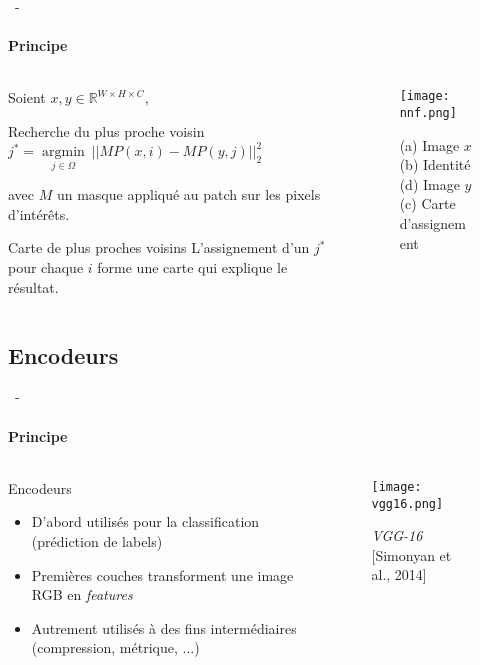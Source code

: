\documentclass[aspectratio=169, 22pt]{beamer}
\DeclareMathOperator*{\argmin}{argmin}
\begin{document}
\begin{frame}{\secname~- \subsecname} 
  \framesubtitle{Principe}
  \begin{columns}
    \begin{column}{0.6\linewidth}
      Soient $x, y \in \mathbb{R}^{W \times H \times C}$,
      \begin{block}{Recherche du plus proche voisin}
        \centering
        $j^* = \underset{j \in \Omega}{\argmin}\ ||MP(x,i) - MP(y,j)||_2^2$
      \end{block}
      {\small avec $M$ un masque appliqué au patch sur les pixels d'intérêts.}
      
      \pause
      \begin{exampleblock}{Carte de plus proches voisins}
        \centering
        L'assignement d'un $j^*$ pour chaque $i$ forme une carte qui \alert{explique} le résultat.
      \end{exampleblock}
    \end{column}
    \begin{column}{0.4\linewidth}
      \begin{figure}
        \centering
        \texttt{[image: nnf.png]}
        \caption{(a) Image $x$ (b) Identité \\ (d) Image $y$ (c) Carte d'assignement}
      \end{figure}
    \end{column}
  \end{columns}
\end{frame}

\subsection{Encodeurs}
\begin{frame}{\secname~- \subsecname}
  \framesubtitle{Principe}
  \begin{columns}
    \begin{column}{0.4\linewidth}
      \begin{block}{Encodeurs}
        \begin{itemize}
        \item D'abord utilisés pour la classification (prédiction de labels)
        \item Premières couches transforment une image RGB en \alert{\emph{features}}
        \item Autrement utilisés à des fins intermédiaires (compression, métrique, ...)
        \end{itemize}
      \end{block}
    \end{column}
    \begin{column}{0.6\linewidth}
      \begin{figure}
        \centering
        \texttt{[image: vgg16.png]}
        \caption{\emph{VGG-16} [Simonyan et al., 2014]}
      \end{figure}
    \end{column}
  \end{columns}
\end{frame}
\end{document}
